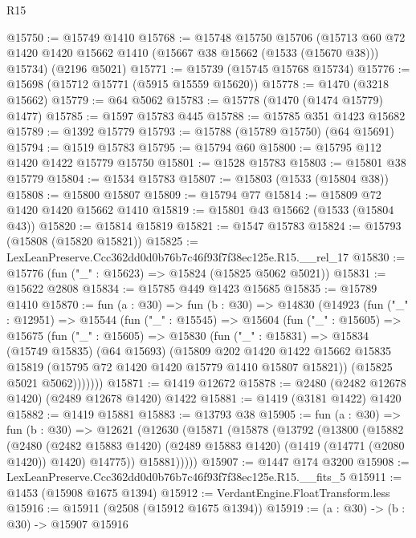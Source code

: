 \begin{lexlean}{R15}
\begin{coremodule}
@15750 := @15749 @1410
@15768 := @15748
    @15750
    @15706
    (@15713 @60 @72 @1420 @1420 @15662 @1410 (@15667 @38 @15662 (@1533 (@15670 @38))) @15734)
    (@2196 @5021)
@15771 := @15739 (@15745 @15768 @15734)
@15776 := @15698 (@15712 @15771 (@5915 @15559 @15620))
@15778 := @1470 (@3218 @15662)
@15779 := @64 @5062
@15783 := @15778 (@1470 (@1474 @15779) @1477)
@15785 := @1597 @15783 @445
@15788 := @15785 @351 @1423 @15682
@15789 := @1392 @15779
@15793 := @15788 (@15789 @15750) (@64 @15691)
@15794 := @1519 @15783
@15795 := @15794 @60
@15800 := @15795 @112 @1420 @1422 @15779 @15750
@15801 := @1528 @15783
@15803 := @15801 @38 @15779
@15804 := @1534 @15783
@15807 := @15803 (@1533 (@15804 @38))
@15808 := @15800 @15807
@15809 := @15794 @77
@15814 := @15809 @72 @1420 @1420 @15662 @1410
@15819 := @15801 @43 @15662 (@1533 (@15804 @43))
@15820 := @15814 @15819
@15821 := @1547 @15783
@15824 := @15793 (@15808 (@15820 @15821))
@15825 := LexLeanPreserve.Ccc362dd0d0b76b7c46f93f7f38ec125e.R15.__rel_17
@15830 := @15776 (fun ("_" : @15623) => @15824 (@15825 @5062 @5021))
@15831 := @15622 @2808
@15834 := @15785 @449 @1423 @15685
@15835 := @15789 @1410
@15870 := fun (a : @30) =>
  fun (b : @30) =>
  @14830
    (@14923
      (fun ("_" : @12951) =>
      @15544
        (fun ("_" : @15545) =>
        @15604
          (fun ("_" : @15605) =>
          @15675
            (fun ("_" : @15605) =>
            @15830
              (fun ("_" : @15831) =>
              @15834
                (@15749 @15835)
                (@64 @15693)
                (@15809
                  @202
                  @1420
                  @1422
                  @15662
                  @15835
                  @15819
                  (@15795 @72 @1420 @1420 @15779 @1410 @15807 @15821))
                (@15825 @5021 @5062)))))))
@15871 := @1419 @12672
@15878 := @2480 (@2482 @12678 @1420) (@2489 @12678 @1420) @1422
@15881 := @1419 (@3181 @1422) @1420
@15882 := @1419 @15881
@15883 := @13793 @38
@15905 := fun (a : @30) =>
  fun (b : @30) =>
  @12621
    (@12630
      (@15871
        (@15878
          (@13792
            (@13800
              (@15882
                (@2480
                  (@2482 @15883 @1420)
                  (@2489 @15883 @1420)
                  (@1419 (@14771 (@2080 @1420)) @1420)
                  @14775))
              @15881)))))
@15907 := @1447 @174 @3200
@15908 := LexLeanPreserve.Ccc362dd0d0b76b7c46f93f7f38ec125e.R15.__fits_5
@15911 := @1453 (@15908 @1675 @1394)
@15912 := VerdantEngine.FloatTransform.less
@15916 := @15911 (@2508 (@15912 @1675 @1394))
@15919 := (a : @30) -> (b : @30) -> @15907 @15916

\end{coremodule}
\end{lexlean}
